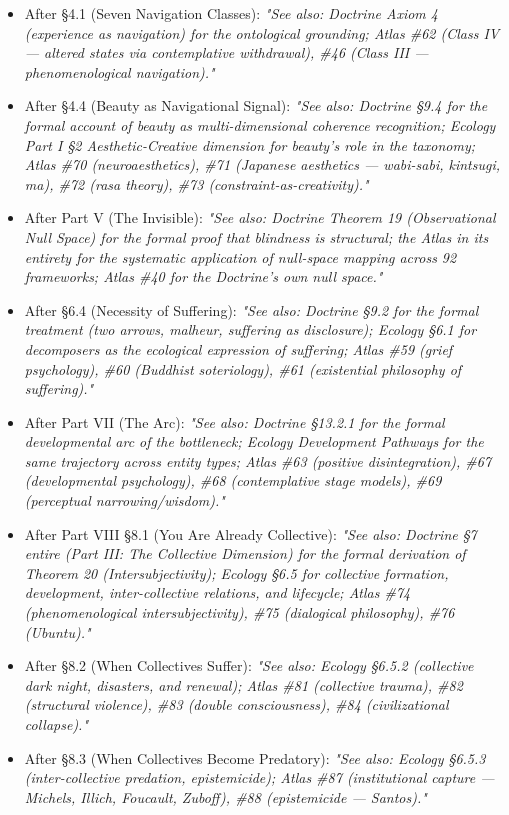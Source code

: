 \begin{itemize}[nosep,leftmargin=*]
  \item After §4.1 (Seven Navigation Classes): \textit{"See also: Doctrine Axiom 4 (experience as navigation) for the ontological grounding; Atlas \#62 (Class IV — altered states via contemplative withdrawal), \#46 (Class III — phenomenological navigation)."}
  \item After §4.4 (Beauty as Navigational Signal): \textit{"See also: Doctrine §9.4 for the formal account of beauty as multi-dimensional coherence recognition; Ecology Part I §2 Aesthetic-Creative dimension for beauty's role in the taxonomy; Atlas \#70 (neuroaesthetics), \#71 (Japanese aesthetics — wabi-sabi, kintsugi, ma), \#72 (rasa theory), \#73 (constraint-as-creativity)."}
  \item After Part V (The Invisible): \textit{"See also: Doctrine Theorem 19 (Observational Null Space) for the formal proof that blindness is structural; the Atlas in its entirety for the systematic application of null-space mapping across 92 frameworks; Atlas \#40 for the Doctrine's own null space."}
  \item After §6.4 (Necessity of Suffering): \textit{"See also: Doctrine §9.2 for the formal treatment (two arrows, malheur, suffering as disclosure); Ecology §6.1 for decomposers as the ecological expression of suffering; Atlas \#59 (grief psychology), \#60 (Buddhist soteriology), \#61 (existential philosophy of suffering)."}
  \item After Part VII (The Arc): \textit{"See also: Doctrine §13.2.1 for the formal developmental arc of the bottleneck; Ecology Development Pathways for the same trajectory across entity types; Atlas \#63 (positive disintegration), \#67 (developmental psychology), \#68 (contemplative stage models), \#69 (perceptual narrowing/wisdom)."}
  \item After Part VIII §8.1 (You Are Already Collective): \textit{"See also: Doctrine §7 entire (Part III: The Collective Dimension) for the formal derivation of Theorem 20 (Intersubjectivity); Ecology §6.5 for collective formation, development, inter-collective relations, and lifecycle; Atlas \#74 (phenomenological intersubjectivity), \#75 (dialogical philosophy), \#76 (Ubuntu)."}
  \item After §8.2 (When Collectives Suffer): \textit{"See also: Ecology §6.5.2 (collective dark night, disasters, and renewal); Atlas \#81 (collective trauma), \#82 (structural violence), \#83 (double consciousness), \#84 (civilizational collapse)."}
  \item After §8.3 (When Collectives Become Predatory): \textit{"See also: Ecology §6.5.3 (inter-collective predation, epistemicide); Atlas \#87 (institutional capture — Michels, Illich, Foucault, Zuboff), \#88 (epistemicide — Santos)."}

\end{itemize}
